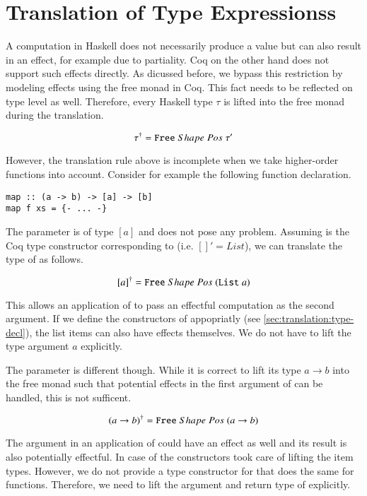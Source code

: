 \section{Translation of Type Expressionss} \label{sec:translation:type}

A computation in Haskell does not necessarily produce a value but can also result in an effect, for example due to partiality.
Coq on the other hand does not support such effects directly.
As dicussed before, we bypass this restriction by modeling effects using the free monad in Coq.
This fact needs to be reflected on type level as well.
Therefore, every Haskell type $\tau$ is lifted into the free monad during the translation.

\[
  {\tau}^{\dagger} = {\texttt{Free}}\;Shape\;Pos\;{\tau'}
\]

However, the translation rule above is incomplete when we take higher-order functions into account.
Consider for example the following function declaration.

\begin{verbatim}
map :: (a -> b) -> [a] -> [b]
map f xs = {- ... -}
\end{verbatim}

The parameter  is of type $[a]$ and does not pose any problem.
Assuming  is the Coq type constructor corresponding to \haskell{[]} (i.e. $[]' = List$), we can translate the type of  as follows.

\[
  {[a]}^{\dagger} = {\texttt{Free}}\;Shape\;Pos\;{(\texttt{List}\;a)}
\]

This allows an application of  to pass an effectful computation as the second argument.
If we define the constructors of  appopriatly (see \autoref{sec:translation:type-decl}), the list items can also have effects themselves.
We do not have to lift the type argument $a$ explicitly.

The parameter  is different though.
While it is correct to lift its type $a \rightarrow b$ into the free monad such that potential effects in the first argument of  can be handled, this is not sufficent.

\[
  {(a \rightarrow b)}^{\dagger} = {\texttt{Free}}\;Shape\;Pos\;{(a \rightarrow b)}
\]

The argument in an application of  could have an effect as well and its result is also potentially effectful.
In case of  the  constructors took care of lifting the item types.
However, we do not provide a type constructor for \coq{->} that does the same for functions.
Therefore, we need to lift the argument and return type of  explicitly.

